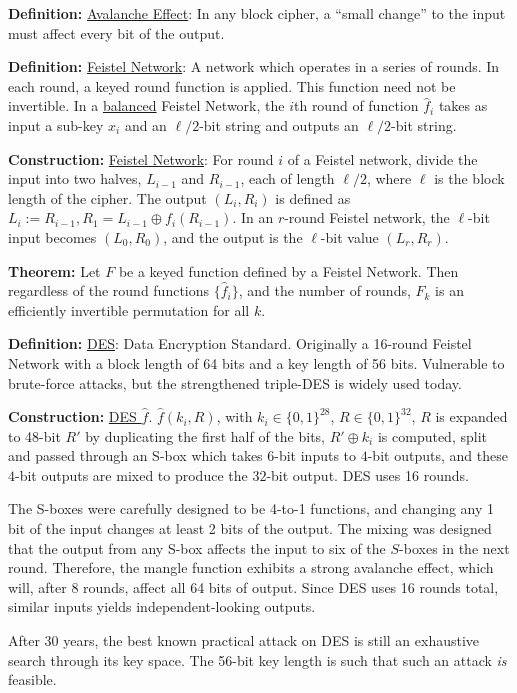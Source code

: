\documentclass[12pt]{article}
\newcommand{\defn}[1]{{\bf Definition:} \underline{#1}}
\newcommand{\thm}[1]{{\bf Theorem:} \underline{#1}}
\newcommand{\con}[1]{{\bf Construction:} \underline{#1}}
\newcommand{\xor}{\oplus}
\begin{document}
\begin{multicols}{2}
\defn{Avalanche Effect}: In any block cipher, a ``small change'' to the input must affect every bit of the output.

\defn{Feistel Network}: A network which operates in a series of rounds. In each round, a keyed round function is applied. This function need not be invertible. In a \underline{balanced} Feistel Network, the $i$th round of function $\hat{f}_i$ takes as input a sub-key $x_i$ and an $\ell/2$-bit string and outputs an $\ell/2$-bit string.

\con{Feistel Network}: For round $i$ of a Feistel network, divide the input into two halves, $L_{i-1}$ and $R_{i-1}$, each of length $\ell/2$, where $\ell$ is the block length of the cipher. The output $(L_i,R_i)$ is defined as $L_i:=R_{i-1}, R_1=L_{i-1}\xor f_i(R_{i-1})$. In an $r$-round Feistel network, the $\ell$-bit input becomes $(L_0,R_0)$, and the output is the $\ell$-bit value $(L_r,R_r)$.

\thm{}Let $F$ be a keyed function defined by a Feistel Network. Then regardless of the round functions $\{\hat{f}_i\}$, and the number of rounds, $F_k$ is an efficiently invertible permutation for all $k$.

\defn{DES}: Data Encryption Standard. Originally a 16-round Feistel Network with a block length of 64 bits and a key length of 56 bits. Vulnerable to brute-force attacks, but the strengthened triple-DES is widely used today.

\con{DES $\hat{f}$}. $\hat{f}(k_i,R)$, with $k_i\in\{0,1\}^{28}$, $R\in\{0,1\}^{32}$, $R$ is expanded to 48-bit $R'$ by duplicating the first half of the bits, $R'\xor k_i$ is computed, split and passed through an S-box which takes $6$-bit inputs to $4$-bit outputs, and these $4$-bit outputs are mixed to produce the $32$-bit output. DES uses 16 rounds.

The S-boxes were carefully designed to be 4-to-1 functions, and changing any 1 bit of the input changes at least 2 bits of the output. The mixing was designed that the output from any S-box affects the input to six of the $S$-boxes in the next round. Therefore, the mangle function exhibits a strong avalanche effect, which will, after 8 rounds, affect all 64 bits of output. Since DES uses 16 rounds total, similar inputs yields independent-looking outputs.

After 30 years, the best known practical attack on DES is still an exhaustive search through its key space. The 56-bit key length is such that such an attack {\it is} feasible.


\end{multicols}
\end{document}
